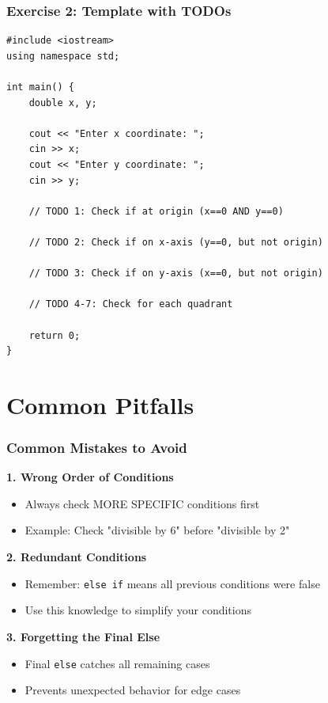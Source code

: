 \documentclass{beamer}
\begin{document}
\begin{frame}[fragile]
\frametitle{Exercise 2: Template with TODOs}

\begin{verbatim}
#include <iostream>
using namespace std;

int main() {
    double x, y;
    
    cout << "Enter x coordinate: ";
    cin >> x;
    cout << "Enter y coordinate: ";
    cin >> y;
    
    // TODO 1: Check if at origin (x==0 AND y==0)
    
    // TODO 2: Check if on x-axis (y==0, but not origin)
    
    // TODO 3: Check if on y-axis (x==0, but not origin)
    
    // TODO 4-7: Check for each quadrant
    
    return 0;
}
\end{verbatim}
\end{frame}

\section{Common Pitfalls}

\begin{frame}
\frametitle{Common Mistakes to Avoid}
\textbf{1. Wrong Order of Conditions}
\begin{itemize}
    \item Always check MORE SPECIFIC conditions first
    \item Example: Check "divisible by 6" before "divisible by 2"
\end{itemize}\pause

\vspace{0.3cm}
\textbf{2. Redundant Conditions}
\begin{itemize}
    \item Remember: \texttt{else if} means all previous conditions were false
    \item Use this knowledge to simplify your conditions
\end{itemize}\pause

\vspace{0.3cm}
\textbf{3. Forgetting the Final Else}
\begin{itemize}
    \item Final \texttt{else} catches all remaining cases
    \item Prevents unexpected behavior for edge cases
\end{itemize}
\end{frame}
\end{document}

